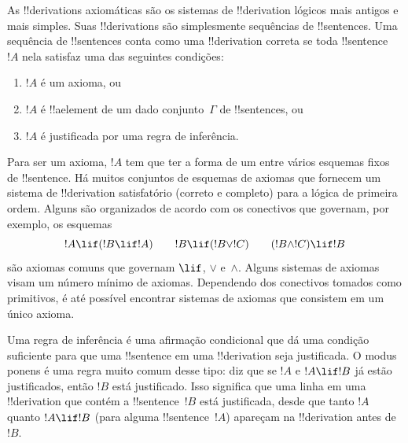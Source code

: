 \documentclass[../../../include/open-logic-section]{subfiles}
\begin{document}
      {}
      {}


As !!{derivation}s axiomáticas são os sistemas de !!{derivation}
lógicos mais antigos e mais simples. Suas !!{derivation}s são
simplesmente sequências de !!{sentence}s.  Uma sequência de
!!{sentence}s conta como uma !!{derivation} correta se toda
!!{sentence}~$!A$ nela satisfaz uma das seguintes condições:
\begin{enumerate}
\item $!A$ é um axioma, ou
\item $!A$ é !!a{element} de um dado conjunto~$\Gamma$ de !!{sentence}s, ou
\item $!A$ é justificada por uma regra de inferência.
\end{enumerate}
Para ser um axioma, $!A$ tem que ter a forma de um entre vários
esquemas fixos de !!{sentence}. Há muitos conjuntos de esquemas de
axiomas que fornecem um sistema de !!{derivation} satisfatório
(correto e completo) para a lógica de primeira ordem. Alguns são
organizados de acordo com os conectivos que governam, por exemplo, os
esquemas
\[
!A \lif (!B \lif !A) \qquad !B \lif (!B \lor !C) \qquad (!B \land !C) \lif !B
\]
são axiomas comuns que governam $\lif$, $\lor$ e~$\land$. Alguns
sistemas de axiomas visam um número mínimo de axiomas. Dependendo dos
conectivos tomados como primitivos, é até possível encontrar sistemas
de axiomas que consistem em um único axioma.

Uma regra de inferência é uma afirmação condicional que dá uma
condição suficiente para que uma !!{sentence} em uma !!{derivation}
seja justificada. O modus ponens é uma regra muito comum desse tipo:
diz que se $!A$ e $!A \lif !B$ já estão justificados, então $!B$ está
justificado. Isso significa que uma linha em uma !!{derivation} que
contém a !!{sentence}~$!B$ está justificada, desde que tanto $!A$
quanto $!A \lif !B$ (para alguma !!{sentence}~$!A$) apareçam na
!!{derivation} antes de~$!B$.
\end{document}
